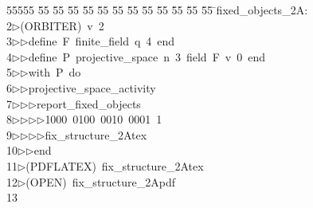 %
%
\begin{tabbing}
55555 \= 55 \= 55 \= 55 \= 55 \= 55 \= 55 \= 55 \= 55 \= 55 \= 55 \= 55 \= 55 \= \>fixed\_objects\_2A:\\[0pt]
2\>$\triangleright$\>(ORBITER)\ v\ 2\ \\[0pt]
3\>$\triangleright$\>$\triangleright$\>define\ F\ finite\_field\ q\ 4\ end\ \\[0pt]
4\>$\triangleright$\>$\triangleright$\>define\ P\ projective\_space\ n\ 3\ field\ F\ v\ 0\ end\ \\[0pt]
5\>$\triangleright$\>$\triangleright$\>with\ P\ do\ \\[0pt]
6\>$\triangleright$\>$\triangleright$\>projective\_space\_activity\ \\[0pt]
7\>$\triangleright$\>$\triangleright$\>$\triangleright$\>report\_fixed\_objects\ \\[0pt]
8\>$\triangleright$\>$\triangleright$\>$\triangleright$\>$\triangleright$\>1000\ 0100\ 0010\ 0001\ 1\ \\[0pt]
9\>$\triangleright$\>$\triangleright$\>$\triangleright$\>$\triangleright$\>fix\_structure\_2Atex\ \\[0pt]
10\>$\triangleright$\>$\triangleright$\>end\ \\[0pt]
11\>$\triangleright$\>(PDFLATEX)\ fix\_structure\_2Atex\\[0pt]
12\>$\triangleright$\>(OPEN)\ fix\_structure\_2Apdf\\[0pt]
13\>\end{tabbing}
